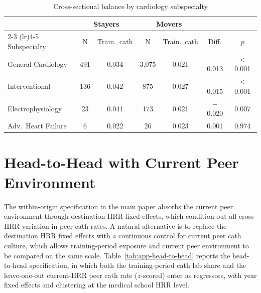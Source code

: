 \documentclass[12pt]{article}
\begin{document}
\begin{table}[htbp]
\centering
\begin{minipage}[h]{\textwidth}
  \caption{Cross-sectional balance by cardiology subspecialty}
  \label{tab:app-balance-spec}
  \centering
  \begin{tabular}{lcccccc}
  \toprule
   & \multicolumn{2}{c}{Stayers} & \multicolumn{2}{c}{Movers} & & \\
  \cmidrule(lr){2-3} \cmidrule(lr){4-5}
  Subspecialty & N & Train.\ cath & N & Train.\ cath & Diff. & $p$ \\
  \midrule
  General Cardiology     & 491   & 0.034 & 3{,}075 & 0.021 & $-$0.013 & $<$0.001 \\
  Interventional         & 136   & 0.042 & 875     & 0.027 & $-$0.015 & $<$0.001 \\
  Electrophysiology      & 23    & 0.041 & 173     & 0.021 & $-$0.020 & 0.007 \\
  Adv.\ Heart Failure    & 6     & 0.022 & 26      & 0.023 & 0.001    & 0.974 \\
  \bottomrule
  \end{tabular}
\end{minipage}
\end{table}

\section{Head-to-Head with Current Peer Environment}\label{sec:app-aha}

The within-origin specification in the main paper absorbs the current peer environment through destination HRR fixed effects, which condition out all cross-HRR variation in peer cath rates. A natural alternative is to replace the destination HRR fixed effects with a continuous control for current peer cath culture, which allows training-period exposure and current peer environment to be compared on the same scale. Table~\ref{tab:app-head-to-head} reports the head-to-head specification, in which both the training-period cath lab share and the leave-one-out current-HRR peer cath rate ($z$-scored) enter as regressors, with year fixed effects and clustering at the medical school HRR level.

\begin{table}[htbp]
\centering
\begin{minipage}[h]{\textwidth}
  \caption{Head-to-head specification, training cath share and current peer cath culture}
  \label{tab:app-head-to-head}
  \centering
  
\end{minipage}
\end{table}
\end{document}

